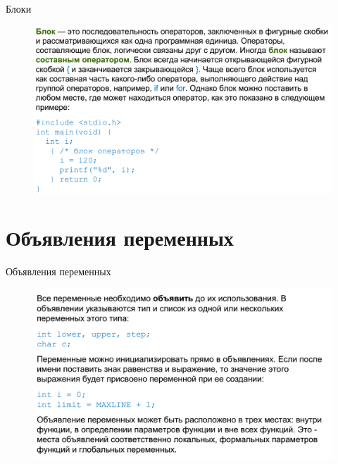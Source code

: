 \documentclass{beamer}
\begin{document}
\begin{frame}{Блоки}
\begin{figure}[h]
\centering
\includegraphics[scale=0.4]{images/lec02-pic03.png}
\end{figure}
\end{frame}

\section{Объявления переменных}

\begin{frame}{Объявления переменных}
\begin{figure}[h]
\centering
\includegraphics[scale=0.4]{images/lec02-pic04.png}
\end{figure}
\end{frame}
\end{document}
